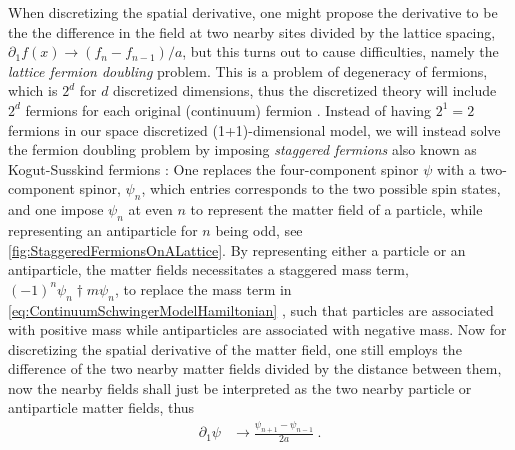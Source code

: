 \documentclass[../main.tex]{subfiles} %
\begin{document}
When discretizing the spatial derivative, one might propose the derivative to be the the difference in the field at two nearby sites divided by the lattice spacing, $\partial_1 f(x) \rightarrow (f_n - f_{n - 1}) / a$, but this turns out to cause difficulties, namely the \emph{lattice fermion doubling} problem. This is a problem of degeneracy of fermions, which is $2^d$ for $d$ discretized dimensions, thus the discretized theory will include $2^d$ fermions for each original (continuum) fermion \cite{GoswamiBandyopadhyay_FermionDoubling_1997}. Instead of having $2^1 = 2$ fermions in our space discretized (1+1)-dimensional model, we will instead solve the fermion doubling problem by imposing \emph{staggered fermions} also known as Kogut-Susskind fermions \cite{susskind_latticeFermions_1977, banksSusskindKogut_StrongCoupling_1976}: One replaces the four-component spinor $\psi$ with a two-component spinor, $\psi_n$, which entries corresponds to the two possible spin states, and one impose $\psi_n$ at even $n$ to represent the matter field of a particle, while representing an antiparticle for $n$ being odd, see \cref{fig:StaggeredFermionsOnALattice}. By representing either a particle or an antiparticle, the matter fields necessitates a staggered mass term, $(-1)^n \psi_n\dagger m \psi_n$, to replace the mass term in \cref{eq:ContinuumSchwingerModelHamiltonian} \cite{susskind_latticeFermions_1977}, such that particles are associated with positive mass while antiparticles are associated with negative mass. Now for discretizing the spatial derivative of the matter field, one still employs the difference of the two nearby matter fields divided by the distance between them, now the nearby fields shall just be interpreted as the two nearby particle or antiparticle matter fields, thus \cite{susskind_latticeFermions_1977}
\begin{align}
    \partial_1 \psi &\rightarrow \frac{\psi_{n+1} - \psi_{n-1}}{2a} \: .
\end{align}
\end{document}
